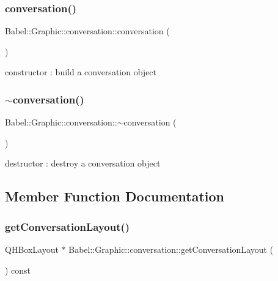 \subsubsection{\texorpdfstring{conversation()}{conversation()}}
{\footnotesize\ttfamily Babel\+::\+Graphic\+::conversation\+::conversation (\begin{DoxyParamCaption}{ }\end{DoxyParamCaption})}

constructor \+: build a conversation object \mbox{\label{classBabel_1_1Graphic_1_1conversation_a28330c44d43a705369edcb7fb834b6d3}} 
\subsubsection{\texorpdfstring{$\sim$conversation()}{~conversation()}}
{\footnotesize\ttfamily Babel\+::\+Graphic\+::conversation\+::$\sim$conversation (\begin{DoxyParamCaption}{ }\end{DoxyParamCaption})\hspace{0.3cm}{\ttfamily [default]}}

destructor \+: destroy a conversation object 

\subsection{Member Function Documentation}
\mbox{\label{classBabel_1_1Graphic_1_1conversation_a3a04c3a478032580c2c13d4fe95ee9bf}} 
\subsubsection{\texorpdfstring{get\+Conversation\+Layout()}{getConversationLayout()}}
{\footnotesize\ttfamily Q\+H\+Box\+Layout $\ast$ Babel\+::\+Graphic\+::conversation\+::get\+Conversation\+Layout (\begin{DoxyParamCaption}{ }\end{DoxyParamCaption}) const}

